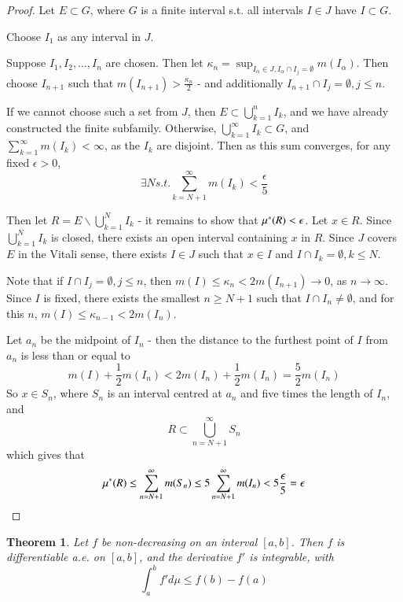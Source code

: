 \documentclass[11pt,a4paper]{report}
\theoremstyle{plain}
\newtheorem{thm}{Theorem}[section]
\theoremstyle{definition}
\theoremstyle{remark}
\newcommand{\intersection}{\cap}
\newcommand{\Union}{\bigcup}
\begin{document}
\begin{proof}
  Let $E \subset G$, where $G$ is a finite interval s.t. all intervals $I \in J$ have $I \subset G$.

  Choose $I_1$ as any interval in $J$.

    Suppose $I_1, I_2, \dots, I_n$ are chosen. Then let $\kappa_n = \sup_{I_\alpha \in J, I_\alpha \intersection I_j = \emptyset} m(I_\alpha)$. Then choose $I_{n+1}$ such that $m(I_{n+1}) > \frac{\kappa_n}{2}$ - and additionally $I_{n+1} \intersection I_j = \emptyset, j \le n$.

    If we cannot choose such a set from $J$, then $E \subset \Union_{k=1}^n I_k$, and we have already constructed the finite subfamily. Otherwise, $\Union_{k=1}^\infty I_k \subset G$, and $\sum_{k=1}^\infty m(I_k) < \infty$, as the $I_k$ are disjoint. Then as this sum converges, for any fixed $\epsilon > 0$, 
    $$ \exists N s.t. \sum_{k=N+1}^\infty m(I_k) < \frac{\epsilon}{5} $$

    Then let $R = E \backslash \Union_{k=1}^N I_k$ - it remains to show that $\mu^{*}(R) < \epsilon$. Let $x \in R$. Since $\Union_{k=1}^N I_k$ is closed, there exists an open interval containing $x$ in $R$. Since $J$ covers $E$ in the Vitali sense, there exists $I \in J$ such that $x \in I$ and $I \intersection I_k = \emptyset, k \le N$.

    Note that if $I \intersection I_j = \emptyset, j \le n$, then $m(I) \le \kappa_n < 2m(I_{n+1}) \rightarrow 0$, as $n \rightarrow \infty$. Since $I$ is fixed, there exists the smallest $n \ge N+1$ such that $I \intersection I_n \ne \emptyset$, and for this $n$, $m(I) \le \kappa_{n-1} < 2m(I_n)$.

    Let $a_n$ be the midpoint of $I_n$ - then the distance to the furthest point of $I$ from $a_n$  is less than or equal to 
    $$ m(I) + \frac{1}{2}m(I_n) < 2m(I_n) + \frac{1}{2}m(I_n) = \frac{5}{2}m(I_n) $$
    So $x \in S_n$, where $S_n$ is an interval centred at $a_n$ and five times the length of $I_n$, and
    $$ R \subset \Union_{n=N+1}^\infty S_n $$
    which gives that
    $$ \mu^{*}(R) \le \sum_{n=N+1}^\infty m(S_n) \le 5\sum_{n=N+1}^\infty m(I_n) < 5\frac{\epsilon}{5} = \epsilon $$
\end{proof}

\begin{thm}\label{integral_of_non_decreasing_derivative_is_less_than_difference_of_bounds}
  Let $f$ be non-decreasing on an interval $[a, b]$. Then $f$ is differentiable a.e. on $[a, b]$, and the derivative $f'$ is integrable, with
  $$ \int_a^b f' d\mu \le f(b) - f(a) $$
\end{thm}
\end{document}
